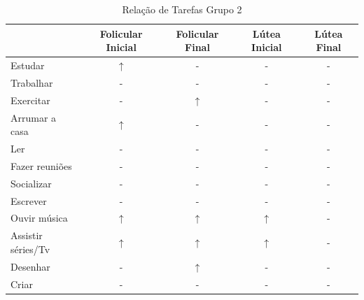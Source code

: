     \begin{table}[]
        \centering
        \caption{Relação de Tarefas Grupo 2}
        \label{tab12}
        \begin{tabular}{|l|c|c|c|c|}
        \hline
        \rowcolor[HTML]{C0C0C0} 
        \multicolumn{1}{|c|}{\cellcolor[HTML]{C0C0C0}Tarefas recomendadas}  & Folicular Inicial & Folicular Final  & Lútea Inicial& Lútea Final \\ \hline
        Estudar & $\uparrow$  & -  & -  & -  \\ \hline
        \rowcolor[HTML]{EFEFEF} 
        Trabalhar & -  & -   & -  &  -   \\ \hline
        Exercitar & -  & $\uparrow$ & -  &  -  \\ \hline
        \rowcolor[HTML]{EFEFEF} 
        Arrumar a casa  & $\uparrow$ & -   & - & - \\ \hline
        Ler & - & -  & - & - \\ \hline
        \rowcolor[HTML]{EFEFEF} 
        Fazer reuniões & - & - & - & - \\ \hline
        \rowcolor[HTML]{EFEFEF} 
        Socializar & - & -  & - & - \\ \hline
        \rowcolor[HTML]{EFEFEF} 
        Escrever & - & -  & - & - \\ \hline
        Ouvir música & $\uparrow$ & $\uparrow$ & $\uparrow$ & - \\ \hline
        \rowcolor[HTML]{EFEFEF} 
        Assistir séries/Tv & $\uparrow$ & $\uparrow$ &$\uparrow$ & -\\ \hline
        Desenhar & - & $\uparrow$  & - & - \\ \hline
        \rowcolor[HTML]{EFEFEF} 
        Criar & - & -  & - & - \\ \hline
        \end{tabular}
        \end{table}



